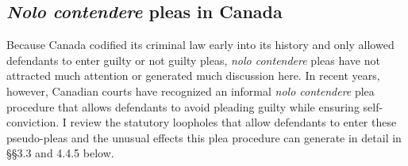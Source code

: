 \subsection{\textit{Nolo contendere} pleas in Canada}

Because Canada codified its criminal law early into its history and only allowed defendants to enter guilty or not guilty pleas, \textit{nolo contendere} pleas have not attracted much attention or generated much discussion here. In recent years, however, Canadian courts have recognized an informal \textit{nolo contendere} plea procedure that allows defendants to avoid pleading guilty while ensuring self-conviction. I review the statutory loopholes that allow defendants to enter these pseudo-pleas and the unusual effects this plea procedure can generate in detail in \S\S 3.3 and 4.4.5 below.